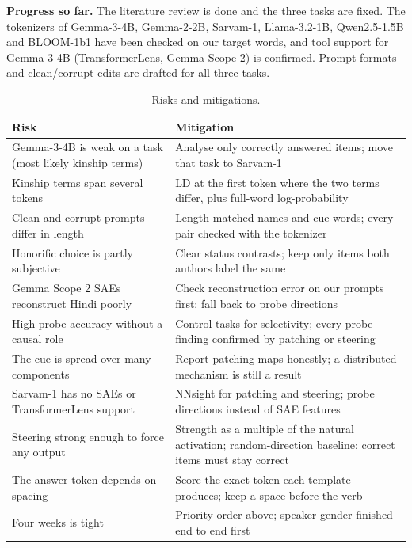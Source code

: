 \documentclass[11pt,a4paper]{article}
\begin{document}
\textbf{Progress so far.} The literature review is done and the three tasks are fixed. The tokenizers of Gemma-3-4B, Gemma-2-2B, Sarvam-1, Llama-3.2-1B, Qwen2.5-1.5B and BLOOM-1b1 have been checked on our target words, and tool support for Gemma-3-4B (TransformerLens, Gemma Scope 2) is confirmed. Prompt formats and clean/corrupt edits are drafted for all three tasks.

\begin{table}[H]
\centering
\small
\begin{tabularx}{\textwidth}{@{}>{\raggedright\arraybackslash}p{} Y@{}}
\toprule
\textbf{Risk} & \textbf{Mitigation} \\
\midrule
Gemma-3-4B is weak on a task (most likely kinship terms) & Analyse only correctly answered items; move that task to Sarvam-1 \\
Kinship terms span several tokens & LD at the first token where the two terms differ, plus full-word log-probability \\
Clean and corrupt prompts differ in length & Length-matched names and cue words; every pair checked with the tokenizer \\
Honorific choice is partly subjective & Clear status contrasts; keep only items both authors label the same \\
Gemma Scope 2 SAEs reconstruct Hindi poorly & Check reconstruction error on our prompts first; fall back to probe directions \\
High probe accuracy without a causal role & Control tasks for selectivity; every probe finding confirmed by patching or steering \\
The cue is spread over many components & Report patching maps honestly; a distributed mechanism is still a result \\
Sarvam-1 has no SAEs or TransformerLens support & NNsight for patching and steering; probe directions instead of SAE features \\
Steering strong enough to force any output & Strength as a multiple of the natural activation; random-direction baseline; correct items must stay correct \\
The answer token depends on spacing & Score the exact token each template produces; keep a space before the verb \\
Four weeks is tight & Priority order above; speaker gender finished end to end first \\
\bottomrule
\end{tabularx}
\caption{Risks and mitigations.}
\label{tab:risks}
\end{table}
\end{document}

